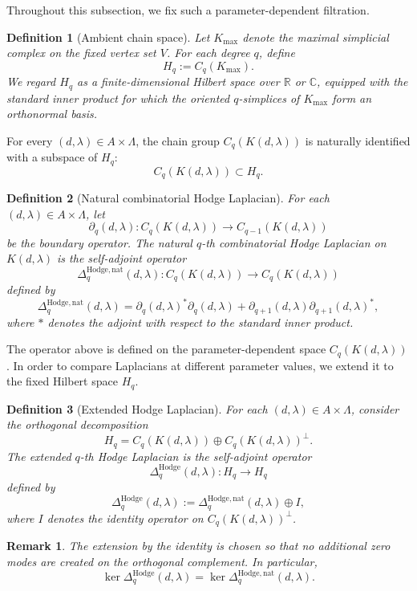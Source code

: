 \documentclass[10pt,a4paper]{amsart}
\newtheorem{remark}{Remark}%
\newtheorem{definition}{Definition}%
\begin{document}
Throughout this subsection, we fix such a parameter-dependent filtration.

\begin{definition}[Ambient chain space]
Let \(K_{\max}\) denote the maximal simplicial complex on the fixed vertex set
\(V\). For each degree \(q\), define
\[
H_q:=C_q(K_{\max}).
\]
We regard \(H_q\) as a finite-dimensional Hilbert space over \(\mathbb{R}\) or
\(\mathbb{C}\), equipped with the standard inner product for which the oriented
\(q\)-simplices of \(K_{\max}\) form an orthonormal basis.
\end{definition}

For every \((d,\lambda)\in A\times\Lambda\), the chain group
\(C_q(K(d,\lambda))\) is naturally identified with a subspace of \(H_q\):
\[
C_q(K(d,\lambda))\subset H_q.
\]

\begin{definition}[Natural combinatorial Hodge Laplacian]
For each \((d,\lambda)\in A\times\Lambda\), let
\[
\partial_q(d,\lambda):
C_q(K(d,\lambda))\longrightarrow C_{q-1}(K(d,\lambda))
\]
be the boundary operator. The \emph{natural \(q\)-th combinatorial Hodge
Laplacian} on \(K(d,\lambda)\) is the self-adjoint operator
\[
\Delta_q^{\mathrm{Hodge},\mathrm{nat}}(d,\lambda)
:
C_q(K(d,\lambda))\longrightarrow C_q(K(d,\lambda))
\]
defined by
\[
\Delta_q^{\mathrm{Hodge},\mathrm{nat}}(d,\lambda)
=
\partial_q(d,\lambda)^\ast\partial_q(d,\lambda)
+
\partial_{q+1}(d,\lambda)\partial_{q+1}(d,\lambda)^\ast,
\]
where \(\ast\) denotes the adjoint with respect to the standard inner product.
\end{definition}

The operator above is defined on the parameter-dependent space
\(C_q(K(d,\lambda))\). In order to compare Laplacians at different parameter
values, we extend it to the fixed Hilbert space \(H_q\).

\begin{definition}[Extended Hodge Laplacian]
For each \((d,\lambda)\in A\times\Lambda\), consider the orthogonal
decomposition
\[
H_q
=
C_q(K(d,\lambda))\oplus C_q(K(d,\lambda))^\perp .
\]
The \emph{extended \(q\)-th Hodge Laplacian} is the self-adjoint operator
\[
\Delta_q^{\mathrm{Hodge}}(d,\lambda):H_q\longrightarrow H_q
\]
defined by
\[
\Delta_q^{\mathrm{Hodge}}(d,\lambda)
:=
\Delta_q^{\mathrm{Hodge},\mathrm{nat}}(d,\lambda)\oplus I,
\]
where \(I\) denotes the identity operator on
\(C_q(K(d,\lambda))^\perp\).
\end{definition}

\begin{remark}
The extension by the identity is chosen so that no additional zero modes are
created on the orthogonal complement. In particular,
\[
\ker \Delta_q^{\mathrm{Hodge}}(d,\lambda)
=
\ker \Delta_q^{\mathrm{Hodge},\mathrm{nat}}(d,\lambda).
\]
\end{remark}
\end{document}
